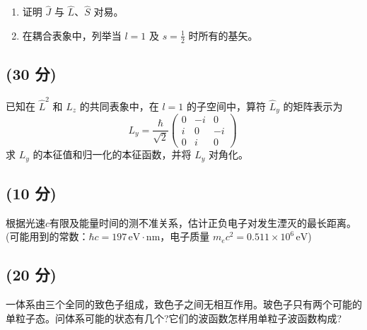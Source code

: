 \begin{enumerate}
    \item 证明 $\hat{J}$ 与 $\hat{L}$、$\hat{S}$ 对易。
    
    \item 在耦合表象中，列举当 $l=1$ 及 $s=\frac{1}{2}$ 时所有的基矢。
\end{enumerate}
\subsection{(30 分)}
已知在 $\hat{L}^2$ 和 $\hat{L}_z$ 的共同表象中，在 $l=1$ 的子空间中，算符 $\hat{L}_y$ 的矩阵表示为
\[
L_y = \frac{\hbar}{\sqrt{2}}
\begin{pmatrix}
0 & -i & 0 \\
i & 0 & -i \\
0 & i & 0 
\end{pmatrix}~
\]
求 $L_y$ 的本征值和归一化的本征函数，并将 $L_y$ 对角化。
\subsection{(10 分)}
根据光速$c$有限及能量时间的测不准关系，估计正负电子对发生湮灭的最长距离。(可能用到的常数：$\hbar c = 197 \, \text{eV} \cdot \text{nm}$，电子质量 $m_e c^2 = 0.511 \times 10^6 \, \text{eV}$)
\subsection{(20 分)}
一体系由三个全同的致色子组成，致色子之间无相互作用。玻色子只有两个可能的单粒子态。问体系可能的状态有几个?它们的波函数怎样用单粒子波函数构成?